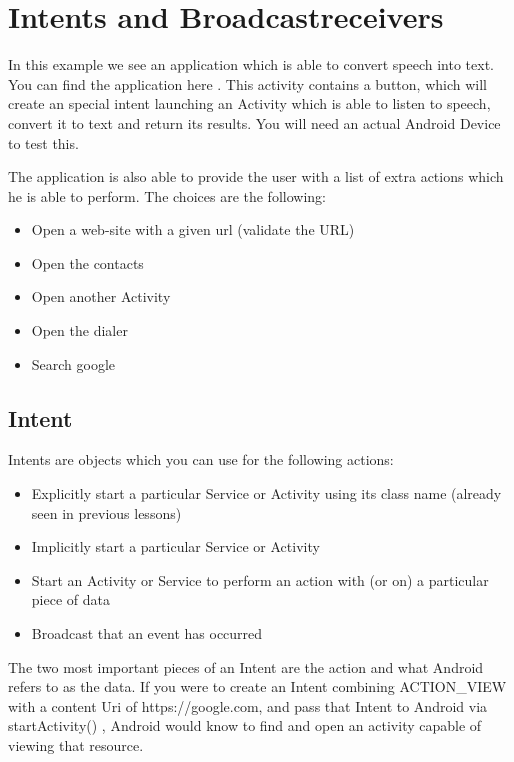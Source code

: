 
\chapter{Intents and Broadcastreceivers}


\begin{example}
	In this example we see an application which is able to convert speech into text. You can find the application here \cite{Buysse18}. This activity contains a button, which will create an special intent launching an Activity which is able to listen to speech, convert it to text and return its results. You will need an actual Android Device to test this. 
	
	The application is also  able to provide the user with a list of extra actions which he is able to perform. The choices are the following:
	\begin{itemize}
		\item Open a web-site with a given url (validate the URL)
		\item Open the contacts
		\item Open another Activity
		\item Open the dialer
		\item Search google
	\end{itemize}
	
\end{example}


\section{Intent}
Intents are objects which you can use for the following actions:


\begin{itemize}
	\item Explicitly start a particular Service or Activity using its class name (already seen in previous lessons)
	\item Implicitly start a particular Service or Activity
	\item Start an Activity or Service to perform an action with (or on) a particular piece of data
	\item Broadcast that an event has occurred
\end{itemize}

The two most important pieces of an Intent are the action and what Android refers
to as the data. If you were to create an Intent combining ACTION\_VIEW with a content Uri of
https://google.com, and pass that Intent to Android via startActivity() ,
Android would know to find and open an activity capable of viewing that resource.


